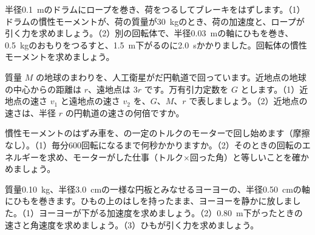 \bkproblem 半径\qty{0.1}{m}のドラムにロープを巻き、荷をつるしてブレーキをはずします。（1）ドラムの慣性モーメントが、荷の質量が\qty{30}{kg}のとき、荷の加速度と、ロープが引く力を求めましょう。（2）別の回転体で、半径\qty{0.03}{m}の軸にひもを巻き、\qty{0.5}{kg}のおもりをつるすと、\qty{1.5}{m}下がるのに\qty{2.0}{s}かかりました。回転体の慣性モーメントを求めましょう。

\bkproblem 質量 $M$ の地球のまわりを、人工衛星がだ円軌道で回っています。近地点の地球の中心からの距離は $r$、遠地点は $3r$ です。万有引力定数を $G$ とします。（1）近地点の速さ $v_1$ と遠地点の速さ $v_2$ を、$G$、$M$、$r$ で表しましょう。（2）近地点の速さは、半径 $r$ の円軌道の速さの何倍ですか。


\bkproblem 慣性モーメントのはずみ車を、の一定のトルクのモーターで回し始めます（摩擦なし）。（1）毎分600回転になるまで何秒かかりますか。（2）そのときの回転のエネルギーを求め、モーターがした仕事（トルク×回った角）と等しいことを確かめましょう。

\bkproblem 質量\qty{0.10}{kg}、半径\qty{3.0}{cm}の一様な円板とみなせるヨーヨーの、半径\qty{0.50}{cm}の軸にひもを巻きます。ひもの上のはしを持ったまま、ヨーヨーを静かに放しました。（1）ヨーヨーが下がる加速度を求めましょう。（2）\qty{0.80}{m}下がったときの速さと角速度を求めましょう。（3）ひもが引く力を求めましょう。

